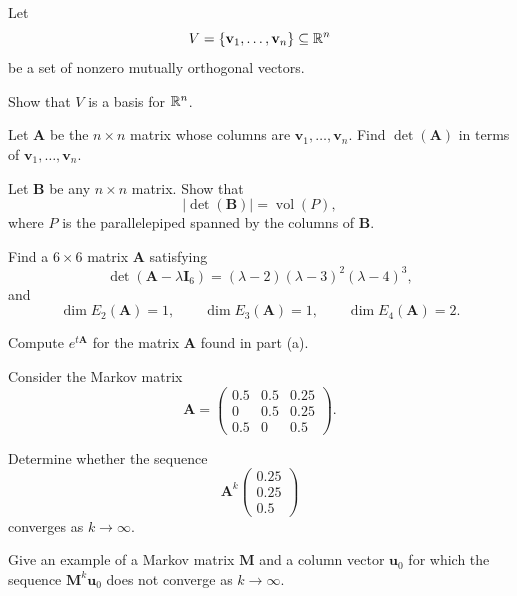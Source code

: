 \begin{problem}
Let
\[
V=\{\mathbf v_1,\dots,\mathbf v_n\}\subseteq\mathbb{R}^n
\]
be a set of nonzero mutually orthogonal vectors.
\begin{problemsubparts}
\item Show that $V$ is a basis for $\mathbb{R}^n$.
\item Let $\mathbf A$ be the $n\times n$ matrix whose columns are $\mathbf v_1,\dots,\mathbf v_n$. Find $\det(\mathbf A)$ in terms of $\mathbf v_1,\dots,\mathbf v_n$.
\item Let $\mathbf B$ be any $n\times n$ matrix. Show that
\[
|\det(\mathbf B)|=\operatorname{vol}(P),
\]
where $P$ is the parallelepiped spanned by the columns of $\mathbf B$.
\end{problemsubparts}
\end{problem}

\begin{problem}
\begin{problemsubparts}
\item Find a $6\times6$ matrix $\mathbf A$ satisfying
\[
\det(\mathbf A-\lambda\mathbf I_6)
=(\lambda-2)(\lambda-3)^2(\lambda-4)^3,
\]
and
\[
\dim E_2(\mathbf A)=1,
\qquad
\dim E_3(\mathbf A)=1,
\qquad
\dim E_4(\mathbf A)=2.
\]
\item Compute $e^{t\mathbf A}$ for the matrix $\mathbf A$ found in part \textup{(a)}.
\end{problemsubparts}
\end{problem}

\begin{problem}
Consider the Markov matrix
\[
\mathbf A=
\begin{pmatrix}
0.5&0.5&0.25\\
0&0.5&0.25\\
0.5&0&0.5
\end{pmatrix}.
\]
\begin{problemsubparts}
\item Determine whether the sequence
\[
\mathbf A^k
\begin{pmatrix}
0.25\\0.25\\0.5
\end{pmatrix}
\]
converges as $k\to\infty$.
\item Give an example of a Markov matrix $\mathbf M$ and a column vector $\mathbf u_0$ for which the sequence $\mathbf M^k\mathbf u_0$ does not converge as $k\to\infty$.
\end{problemsubparts}
\end{problem}

